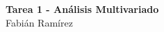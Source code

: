 \begin{center}
    \huge{
    \textbf{
        Tarea 1 - Análisis Multivariado 
    }
    }\\
    \normalsize{
Fabián Ramírez
    }
\end{center}